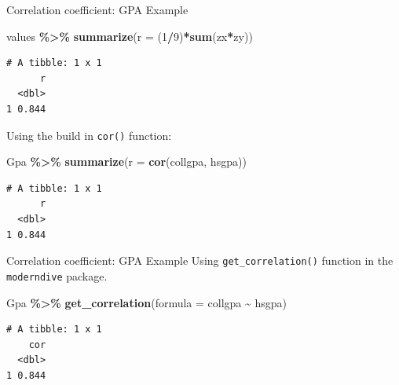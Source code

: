 \documentclass[
  ignorenonframetext,
]{beamer}
\newenvironment{Shaded}{\begin{snugshade}}{\end{snugshade}}
\newcommand{\AttributeTok}[1]{\textcolor[rgb]{0.13,0.29,0.53}{#1}}
\newcommand{\DecValTok}[1]{\textcolor[rgb]{0.00,0.00,0.81}{#1}}
\newcommand{\FunctionTok}[1]{\textcolor[rgb]{0.13,0.29,0.53}{\textbf{#1}}}
\newcommand{\NormalTok}[1]{#1}
\newcommand{\SpecialCharTok}[1]{\textcolor[rgb]{0.81,0.36,0.00}{\textbf{#1}}}
\begin{document}
\begin{frame}[fragile]{Correlation coefficient: GPA Example}
\protect\hypertarget{correlation-coefficient-gpa-example-1}{}
\normalsize

\begin{Shaded}
\begin{Highlighting}[]
\NormalTok{values }\SpecialCharTok{\%\textgreater{}\%} 
  \FunctionTok{summarize}\NormalTok{(}\AttributeTok{r =}\NormalTok{ (}\DecValTok{1}\SpecialCharTok{/}\DecValTok{9}\NormalTok{)}\SpecialCharTok{*}\FunctionTok{sum}\NormalTok{(zx}\SpecialCharTok{*}\NormalTok{zy))}
\end{Highlighting}
\end{Shaded}

\begin{verbatim}
# A tibble: 1 x 1
      r
  <dbl>
1 0.844
\end{verbatim}

\normalsize

Using the build in \texttt{cor()} function:

\normalsize

\begin{Shaded}
\begin{Highlighting}[]
\NormalTok{Gpa }\SpecialCharTok{\%\textgreater{}\%} 
  \FunctionTok{summarize}\NormalTok{(}\AttributeTok{r =} \FunctionTok{cor}\NormalTok{(collgpa, hsgpa))}
\end{Highlighting}
\end{Shaded}

\begin{verbatim}
# A tibble: 1 x 1
      r
  <dbl>
1 0.844
\end{verbatim}

\normalsize
\end{frame}

\begin{frame}[fragile]{Correlation coefficient: GPA Example}
\protect\hypertarget{correlation-coefficient-gpa-example-2}{}
Using \texttt{get\_correlation()} function in the \texttt{moderndive}
package.

\normalsize

\begin{Shaded}
\begin{Highlighting}[]
\NormalTok{Gpa }\SpecialCharTok{\%\textgreater{}\%} 
  \FunctionTok{get\_correlation}\NormalTok{(}\AttributeTok{formula =}\NormalTok{ collgpa }\SpecialCharTok{\textasciitilde{}}\NormalTok{ hsgpa)}
\end{Highlighting}
\end{Shaded}

\begin{verbatim}
# A tibble: 1 x 1
    cor
  <dbl>
1 0.844
\end{verbatim}

\normalsize
\end{frame}
\end{document}
